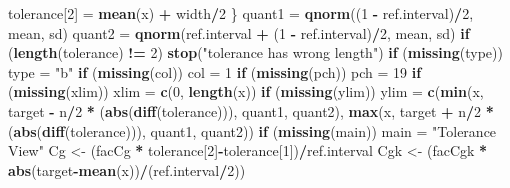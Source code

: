 \documentclass[
]{book}
\newenvironment{Shaded}{\begin{snugshade}}{\end{snugshade}}
\newcommand{\ControlFlowTok}[1]{\textcolor[rgb]{0.13,0.29,0.53}{\textbf{#1}}}
\newcommand{\DecValTok}[1]{\textcolor[rgb]{0.00,0.00,0.81}{#1}}
\newcommand{\FunctionTok}[1]{\textcolor[rgb]{0.13,0.29,0.53}{\textbf{#1}}}
\newcommand{\NormalTok}[1]{#1}
\newcommand{\OtherTok}[1]{\textcolor[rgb]{0.56,0.35,0.01}{#1}}
\newcommand{\SpecialCharTok}[1]{\textcolor[rgb]{0.81,0.36,0.00}{\textbf{#1}}}
\newcommand{\StringTok}[1]{\textcolor[rgb]{0.31,0.60,0.02}{#1}}
\begin{document}
\begin{Shaded}
\begin{Highlighting}[]
\NormalTok{    tolerance[}\DecValTok{2}\NormalTok{] }\OtherTok{=} \FunctionTok{mean}\NormalTok{(x) }\SpecialCharTok{+}\NormalTok{ width}\SpecialCharTok{/}\DecValTok{2}
\NormalTok{  \}}
\NormalTok{  quant1 }\OtherTok{=} \FunctionTok{qnorm}\NormalTok{((}\DecValTok{1} \SpecialCharTok{{-}}\NormalTok{ ref.interval)}\SpecialCharTok{/}\DecValTok{2}\NormalTok{, mean, sd)}
\NormalTok{  quant2 }\OtherTok{=} \FunctionTok{qnorm}\NormalTok{(ref.interval }\SpecialCharTok{+}\NormalTok{ (}\DecValTok{1} \SpecialCharTok{{-}}\NormalTok{ ref.interval)}\SpecialCharTok{/}\DecValTok{2}\NormalTok{, mean, }
\NormalTok{                 sd)}
  \ControlFlowTok{if}\NormalTok{ (}\FunctionTok{length}\NormalTok{(tolerance) }\SpecialCharTok{!=} \DecValTok{2}\NormalTok{) }
    \FunctionTok{stop}\NormalTok{(}\StringTok{"tolerance has wrong length"}\NormalTok{)}
  \ControlFlowTok{if}\NormalTok{ (}\FunctionTok{missing}\NormalTok{(type)) }
\NormalTok{    type }\OtherTok{=} \StringTok{"b"}
  \ControlFlowTok{if}\NormalTok{ (}\FunctionTok{missing}\NormalTok{(col)) }
\NormalTok{    col }\OtherTok{=} \DecValTok{1}
  \ControlFlowTok{if}\NormalTok{ (}\FunctionTok{missing}\NormalTok{(pch)) }
\NormalTok{    pch }\OtherTok{=} \DecValTok{19}
  \ControlFlowTok{if}\NormalTok{ (}\FunctionTok{missing}\NormalTok{(xlim)) }
\NormalTok{    xlim }\OtherTok{=} \FunctionTok{c}\NormalTok{(}\DecValTok{0}\NormalTok{, }\FunctionTok{length}\NormalTok{(x))}
  \ControlFlowTok{if}\NormalTok{ (}\FunctionTok{missing}\NormalTok{(ylim)) }
\NormalTok{    ylim }\OtherTok{=} \FunctionTok{c}\NormalTok{(}\FunctionTok{min}\NormalTok{(x, target }\SpecialCharTok{{-}}\NormalTok{ n}\SpecialCharTok{/}\DecValTok{2} \SpecialCharTok{*}\NormalTok{ (}\FunctionTok{abs}\NormalTok{(}\FunctionTok{diff}\NormalTok{(tolerance))), }
\NormalTok{                 quant1, quant2), }\FunctionTok{max}\NormalTok{(x, target }\SpecialCharTok{+}\NormalTok{ n}\SpecialCharTok{/}\DecValTok{2} \SpecialCharTok{*}\NormalTok{ (}\FunctionTok{abs}\NormalTok{(}\FunctionTok{diff}\NormalTok{(tolerance))), }
\NormalTok{                                      quant1, quant2))}
  \ControlFlowTok{if}\NormalTok{ (}\FunctionTok{missing}\NormalTok{(main)) }
\NormalTok{    main }\OtherTok{=} \StringTok{"Tolerance View"}
\NormalTok{  Cg }\OtherTok{\textless{}{-}}\NormalTok{ (facCg }\SpecialCharTok{*}\NormalTok{ tolerance[}\DecValTok{2}\NormalTok{]}\SpecialCharTok{{-}}\NormalTok{tolerance[}\DecValTok{1}\NormalTok{])}\SpecialCharTok{/}\NormalTok{ref.interval}
\NormalTok{  Cgk }\OtherTok{\textless{}{-}}\NormalTok{ (facCgk }\SpecialCharTok{*} \FunctionTok{abs}\NormalTok{(target}\SpecialCharTok{{-}}\FunctionTok{mean}\NormalTok{(x))}\SpecialCharTok{/}\NormalTok{(ref.interval}\SpecialCharTok{/}\DecValTok{2}\NormalTok{))}
  

\end{Highlighting}
\end{Shaded}
\end{document}
